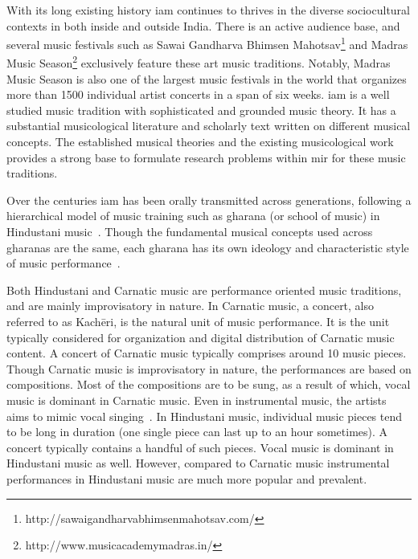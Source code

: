 With its long existing history \gls{iam} continues to thrives in the diverse sociocultural contexts in both inside and outside India. There is an active audience base, and several music festivals such as Sawai Gandharva Bhimsen Mahotsav\footnote{http://sawaigandharvabhimsenmahotsav.com/} and Madras Music Season\footnote{http://www.musicacademymadras.in/} exclusively feature these art music traditions. Notably, Madras Music Season is also one of the largest music festivals in the world that organizes more than 1500 individual artist concerts in a span of six weeks. \Gls{iam} is a well studied music tradition with sophisticated and grounded music theory. It has a substantial musicological literature and scholarly text written on different musical concepts. The established musical theories and the existing musicological work provides a strong base to formulate research problems within \gls{mir} for these music traditions. 

Over the centuries \gls{iam} has been orally transmitted across generations, following a hierarchical model of music training such as \gls{gharana} (or school of music) in Hindustani music~\citep{Saraf2011,Mehta2008}. Though the fundamental musical concepts used across \glspl{gharana} are the same, each \gls{gharana} has its own ideology and characteristic style of music performance~\citep{Deshpande1989}. 

Both Hindustani and Carnatic music are performance oriented music traditions, and are mainly improvisatory in nature. In Carnatic music, a concert, also referred to as Kach\={e}ri, is the natural unit of music performance. It is the unit typically considered for organization and digital distribution of Carnatic music content. A concert of Carnatic music typically comprises around 10 music pieces. Though Carnatic music is improvisatory in nature, the performances are based on compositions. Most of the compositions are to be sung, as a result of which, vocal music is dominant in Carnatic music. Even in instrumental music, the artists aims to mimic vocal singing~\citep{Viswanathan2004}. In Hindustani music, individual music pieces tend to be long in duration (one single piece can last up to an hour sometimes). A concert typically contains a handful of such pieces. Vocal music is dominant in Hindustani music as well. However, compared to Carnatic music instrumental performances in Hindustani music are much more popular and prevalent. 


